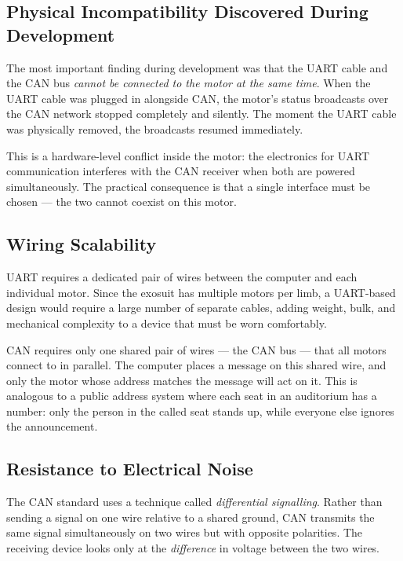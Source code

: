 \documentclass[12pt,a4paper]{article}
\begin{document}
\subsection{Physical Incompatibility Discovered During Development}

The most important finding during development was that the UART cable and
the CAN bus \emph{cannot be connected to the motor at the same time}. When
the UART cable was plugged in alongside CAN, the motor's status broadcasts
over the CAN network stopped completely and silently. The moment the UART
cable was physically removed, the broadcasts resumed immediately.

This is a hardware-level conflict inside the motor: the electronics for UART
communication interferes with the CAN receiver when both are powered
simultaneously. The practical consequence is that a single interface must
be chosen --- the two cannot coexist on this motor.

\subsection{Wiring Scalability}

UART requires a dedicated pair of wires between the computer and each
individual motor. Since the exosuit has multiple motors per limb, a
UART-based design would require a large number of separate cables, adding
weight, bulk, and mechanical complexity to a device that must be worn
comfortably.

CAN requires only one shared pair of wires --- the CAN bus --- that all
motors connect to in parallel. The computer places a message on this shared
wire, and only the motor whose address matches the message will act on it.
This is analogous to a public address system where each seat in an
auditorium has a number: only the person in the called seat stands up,
while everyone else ignores the announcement.

\subsection{Resistance to Electrical Noise}

The CAN standard uses a technique called \emph{differential signalling}.
Rather than sending a signal on one wire relative to a shared ground, CAN
transmits the same signal simultaneously on two wires but with opposite
polarities. The receiving device looks only at the \emph{difference} in
voltage between the two wires.
\end{document}
